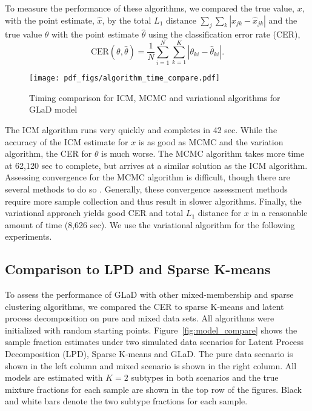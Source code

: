 \documentclass[11pt]{amsart}
\begin{document}
To measure the performance of these algorithms, we compared the true value, $x$, with the point estimate, $\hat{x}$, by the total $L_1$ distance $\sum_j \sum_k | x_{jk} - \hat{x}_{jk} |$  and the true value $\theta$ with the point estimate $\hat{\theta}$ using the classification error rate (CER),
\begin{equation}\label{eqn:cer}
\text{CER}(\theta, \hat{\theta}) = \frac{1}{N} \sum_{i=1}^N \sum_{k=1}^K | \theta_{ki} - \hat{\theta}_{ki} |.
\end{equation}

\begin{figure}[htbp]
\begin{center}
\texttt{[image: pdf\_figs/algorithm\_time\_compare.pdf]}
\caption{Timing comparison for ICM, MCMC and variational algorithms for GLaD model}
\label{fig:alg_compare}
\end{center}
\end{figure}

The ICM algorithm runs very quickly and completes in 42 sec. While the accuracy of the ICM estimate for $x$ is as good as MCMC and the variation algorithm, the CER for $\theta$ is much worse. The MCMC algorithm takes more time at 62,120 sec to complete, but arrives at a similar solution as the ICM algorithm. Assessing convergence for the MCMC algorithm is difficult, though there are several methods to do so \cite{}. Generally, these convergence assessment methods require more sample collection and thus result in slower algorithms. Finally, the variational approach yields good CER and total $L_1$ distance for $x$ in a reasonable amount of time (8,626 sec). We use the variational algorithm for the following experiments.

\subsection{Comparison to LPD and Sparse K-means}

To assess the performance of GLaD with other mixed-membership and sparse clustering algorithms, we compared the CER to sparse K-means and latent process decomposition on pure and mixed data sets. All algorithms were initialized with random starting points. Figure~\ref{fig:model_compare} shows the sample fraction estimates under two simulated data scenarios for Latent Process Decomposition (LPD), Sparse K-means and GLaD. The pure data scenario is shown in the left column and mixed scenario is shown in the right column. All models are estimated with $K=2$ subtypes in both scenarios and the true mixture fractions for each sample are shown in the top row of the figures. Black and white bars denote the two subtype fractions for each sample. 
\end{document}
